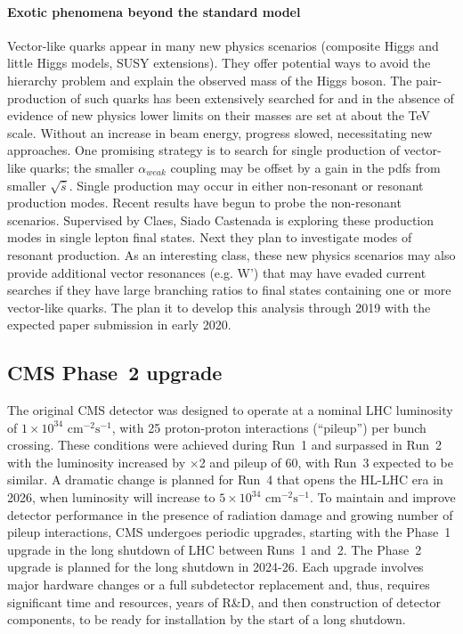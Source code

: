 \paragraph{Exotic phenomena beyond the standard model}
 Vector-like quarks appear in many new physics scenarios (composite Higgs and little Higgs models, SUSY extensions). They offer potential ways to avoid the hierarchy problem and explain the observed mass of the Higgs boson.  The pair-production of such quarks has been extensively searched for and in the absence of evidence of new physics 
 lower limits on their masses are set at about the TeV scale.
 Without an increase in beam energy, progress slowed, necessitating new approaches. One promising strategy is to search for single production of vector-like quarks; the smaller $\alpha_{weak}$ coupling may be offset by a gain in the pdfs from smaller $\sqrt{\hat{s}}$. Single production may occur in either non-resonant or resonant production modes.  Recent results have begun to probe the non-resonant scenarios. Supervised by Claes, Siado Castenada is exploring these production modes in single lepton final states. 
 Next they plan to investigate modes of resonant production.
 As an interesting class, these new physics scenarios may also provide additional vector resonances (e.g. W’) that may have evaded current searches if they have large branching ratios to final states containing one or more vector-like quarks. The plan it to develop this analysis through 2019 with the expected paper submission in early 2020.

\subsection{CMS Phase~2 upgrade}


The original CMS detector was designed to operate at a nominal LHC luminosity of $1\!\times\! 10^{34}\textrm{ cm}^{-2}\textrm{s}^{-1}$, with 25 proton-proton interactions (``pileup'') per bunch crossing. These conditions were achieved during Run~1 and surpassed in Run~2 with the luminosity increased by $\times$2 and pileup of 60, with Run~3 expected to be similar. A dramatic change is planned for Run~4 that opens the HL-LHC era in 2026, when luminosity will increase to $5\!\times\! 10^{34}\textrm{ cm}^{-2}\textrm{s}^{-1}$. To maintain and improve detector performance in the presence of radiation damage and growing number of pileup interactions, CMS undergoes periodic upgrades, starting with the Phase~1 upgrade in the long shutdown of LHC between Runs~1 and~2. The Phase~2 upgrade is planned for the long shutdown in 2024-26. Each upgrade involves major hardware changes or a full subdetector replacement and, thus, requires significant time and resources, years of R\&D, and then construction of detector components, to be ready for installation by the start of a long shutdown.

